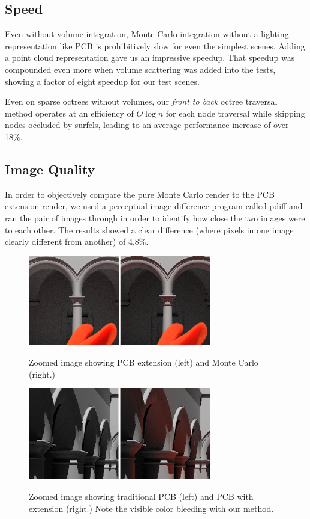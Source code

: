 \documentclass[12pt]{ucthesis}
\newcommand{\captionfonts}{\small\bf\ssp}
\begin{document}
\subsection{Speed}
Even without volume integration, Monte Carlo integration without a lighting representation like PCB is prohibitively slow for even the simplest scenes.  Adding a point cloud representation gave us an impressive speedup.  That speedup was compounded even more when volume scattering was added into the tests, showing a factor of eight speedup for our test scenes.

Even on sparse octrees without volumes, our \textit{front to back} octree traversal method operates at an efficiency of $O\log{n}$ for each node traversal while skipping nodes occluded by surfels, leading to an average performance increase of over 18\%.

\subsection*{Image Quality}

In order to objectively compare the pure Monte Carlo render to the PCB extension render, we used a perceptual image difference program called pdiff and ran the pair of images through in order to identify how close the two images were to each other.  The results showed a clear difference (where pixels in one image clearly different from another) of 4.8\%.


\begin{figure}[h!]
    \centering
    \includegraphics[width=80mm]{img/compare1_corrected.png}
    \captionfonts
    \caption{Zoomed image showing PCB extension (left) and Monte Carlo (right.)}
    \label{fig:compare_close}
\end{figure}

\begin{figure}[h!]
    \centering
    \includegraphics[width=80mm]{img/compare_trad_corrected.png}
    \captionfonts
    \caption{Zoomed image showing traditional PCB (left) and PCB with extension (right.)  Note the visible color bleeding with our method.}
    \label{fig:compare_trad}
\end{figure}
\end{document}
